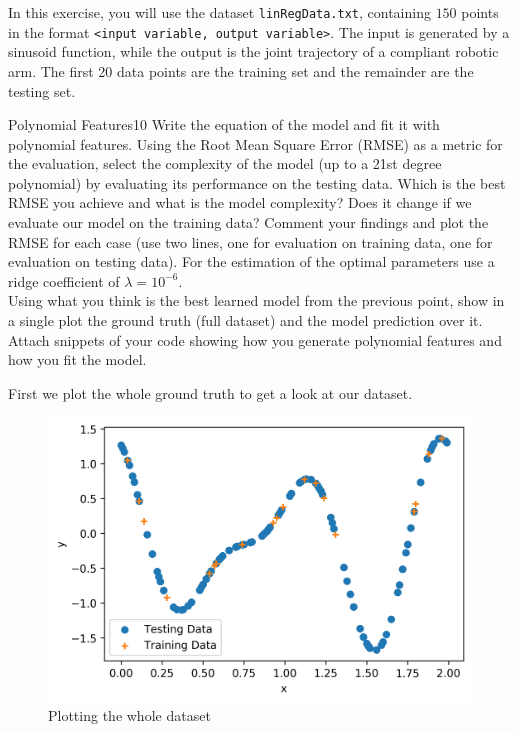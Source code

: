 \newif\ifvimbug
\vimbugfalse

\ifvimbug

\fi


In this exercise, you will use the dataset \texttt{linRegData.txt}, containing $150$ points in the format \texttt{<input variable, output variable>}. The input is generated by a sinusoid function, while the output is the joint trajectory of a compliant robotic arm. 
The first 20 data points are the training set and the remainder are the testing set.

\begin{questions}


\begin{question}{Polynomial Features}{10}
Write the equation of the model and fit it with polynomial features. Using the Root Mean Square Error (RMSE) as a metric for the evaluation, select the complexity of the model (up to a 21st degree polynomial) by evaluating its performance on the testing data. Which is the best RMSE you achieve and what is the model complexity? Does it change if we evaluate our model on the training data? Comment your findings and plot the RMSE for each case (use two lines, one for evaluation on training data, one for evaluation on testing data).
For the estimation of the optimal parameters use a ridge coefficient of $\lambda=10^{-6}$.
\\Using what you think is the best learned model from the previous point, show in a single plot the ground truth (full dataset) and the model prediction over it.
Attach snippets of your code showing how you generate polynomial features and how you fit the model.

\begin{answer}
\end{answer}
First we plot the whole ground truth to get a look at our dataset.
\begin{figure}[H]
	\includegraphics[width=0.6\linewidth]{pictures/groundTruth.png}
	\centering
	\caption{Plotting the whole dataset}
	\label{fig:ground Truth}
\end{figure}


\end{question}
\end{questions}
